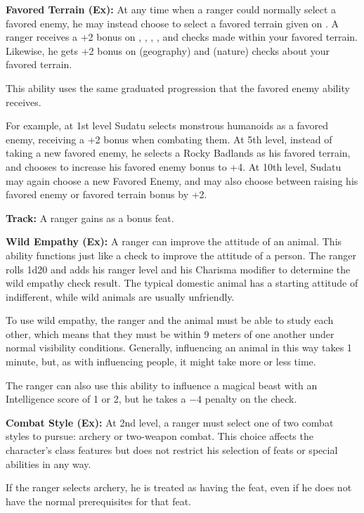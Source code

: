 \textbf{Favored Terrain (Ex):} At any time when a ranger could normally select a favored enemy, he may instead choose to select a favored terrain given on . A ranger receives a +2 bonus on , , , ,  and  checks made within your favored terrain. Likewise, he gets +2 bonus on  (geography) and  (nature) checks about your favored terrain.

This ability uses the same graduated progression that the favored enemy ability receives.

For example, at 1st level Sudatu selects monstrous humanoids as a favored enemy, receiving a +2 bonus when combating them. At 5th level, instead of taking a new favored enemy, he selects a Rocky Badlands as his favored terrain, and chooses to increase his favored enemy bonus to +4. At 10th level, Sudatu may again choose a new Favored Enemy, and may also choose between raising his favored enemy or favored terrain bonus by +2.

\textbf{Track:} A ranger gains  as a bonus feat.

\textbf{Wild Empathy (Ex):} A ranger can improve the attitude of an animal. This ability functions just like a  check to improve the attitude of a person. The ranger rolls 1d20 and adds his ranger level and his Charisma modifier to determine the wild empathy check result. The typical domestic animal has a starting attitude of indifferent, while wild animals are usually unfriendly.

To use wild empathy, the ranger and the animal must be able to study each other, which means that they must be within 9 meters of one another under normal visibility conditions. Generally, influencing an animal in this way takes 1 minute, but, as with influencing people, it might take more or less time.

The ranger can also use this ability to influence a magical beast with an Intelligence score of 1 or 2, but he takes a $-4$ penalty on the check.

\textbf{Combat Style (Ex):} At 2nd level, a ranger must select one of two combat styles to pursue: archery or two-weapon combat. This choice affects the character's class features but does not restrict his selection of feats or special abilities in any way.

If the ranger selects archery, he is treated as having the  feat, even if he does not have the normal prerequisites for that feat.

